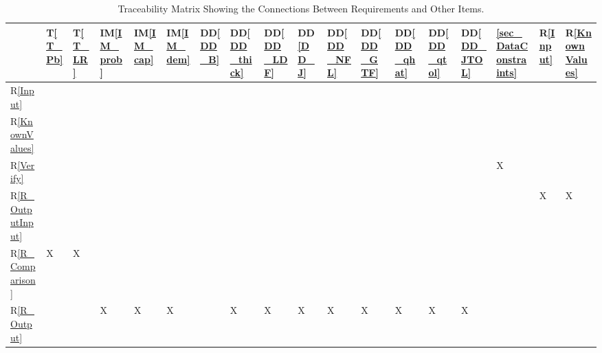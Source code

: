 \documentclass[12pt]{article}
\newcommand{\ddref}[1]{DD\ref{#1}}
\newcommand{\tref}[1]{T\ref{#1}}
\newcommand{\iref}[1]{IM\ref{#1}}
\newcommand{\rref}[1]{R\ref{#1}}
\begin{document}
\begin{table}[h!]
\centering
\begin{tabular}{|P{0.4cm}|P{0.4cm}|P{0.4cm}|P{0.6cm}|P{0.6cm}|P{0.6cm}|P{0.65cm}|
P{0.65cm}|P{0.65cm}|P{0.65cm}|P{0.65cm}|P{0.65cm}|P{0.65cm}|P{0.65cm}|P{0.65cm}|
P{0.8cm}|P{0.4cm}|P{0.4cm}|}
\hline
	& \tref{T_Pb} & \tref{T_LR} & \iref{IM_prob} & \iref{IM_cap} &
	\iref{IM_dem} & \ddref{DD_B} & \ddref{DD_thick} & \ddref{DD_LDF} &
	\ddref{DD_J} & \ddref{DD_NFL} & \ddref{DD_GTF} & \ddref{DD_qhat} &
	\ddref{DD_qtol} & \ddref{DD_JTOL} & \ref{sec_DataConstraints} &
	\rref{Input} & \rref{KnownValues}\\
\hline
\rref{Input}                 & & & & & & & & & & & & & & & & & \\ \hline
\rref{KnownValues}   & & & & & & & & & & & & & & & & & \\ \hline
\rref{Verify}                & & & & & & & & & & & & & & & X & & \\ \hline
\rref{R_OutputInput}  & & & & & & & & & & & & & & & & X & X \\ \hline
\rref{R_ Comparison}  & X & X & & & & & & & & & & & & & & & \\ \hline
\rref{R_Output}          & & & X & X & X & & X & X & X & X & X & X & X & X & & & \\
\hline
\end{tabular}
\caption{Traceability Matrix Showing the Connections Between Requirements and Other Items.}
\label{Table:R_trace}
\end{table}

\newpage
\end{document}
